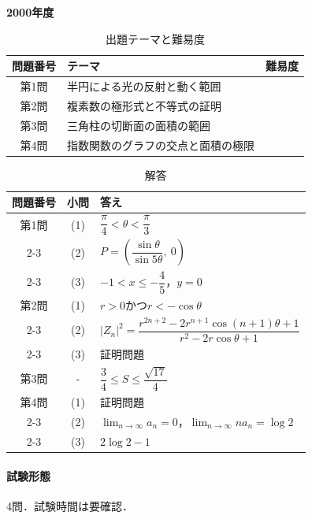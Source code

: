\documentclass[../../main.tex]{subfiles}
\begin{document}
\begin{center}
  {\fontsize{48pt}{58pt}\selectfont \textbf{2000}\normalsize\textbf{年度}}
\end{center}

\begin{table}[htb]
  \centering
  \caption{出題テーマと難易度}
  \begin{tabular}{|c|p{9cm}|c|}
    \hline
    \textbf{問題番号} & \textbf{テーマ} & \textbf{難易度} \\
    \hline
    第1問 & 半円による光の反射と動く範囲 & \\
    \hline
    第2問 & 複素数の極形式と不等式の証明 & \\
    \hline
    第3問 & 三角柱の切断面の面積の範囲 & \\
    \hline
    第4問 & 指数関数のグラフの交点と面積の極限 & \\
    \hline
  \end{tabular}
\end{table}

\begin{table}[htb]
  \centering
  \caption{解答}
  \renewcommand{\arraystretch}{1.4}
  \begin{tabular}{|c|c|p{9cm}|}
    \hline
    \textbf{問題番号} & \textbf{小問} & \textbf{答え} \\
    \hline
    第1問 & (1) & $\dfrac{\pi}{4}<\theta<\dfrac{\pi}{3}$ \\
    \cline{2-3}
    & (2) & $P=\left(\dfrac{\sin\theta}{\sin5\theta},\ 0\right)$ \\
    \cline{2-3}
    & (3) & $-1<x\le-\dfrac{4}{5}$，$y=0$ \\
    \hline
    第2問 & (1) & $r>0$かつ$r<-\cos\theta$ \\
    \cline{2-3}
    & (2) & $|Z_n|^2=\dfrac{r^{2n+2}-2r^{n+1}\cos(n+1)\theta+1}{r^2-2r\cos\theta+1}$ \\
    \cline{2-3}
    & (3) & 証明問題 \\
    \hline
    第3問 & - & $\dfrac{3}{4}\le S\le\dfrac{\sqrt{17}}{4}$ \\
    \hline
    第4問 & (1) & 証明問題 \\
    \cline{2-3}
    & (2) & $\displaystyle\lim_{n\to\infty}a_n=0$，$\displaystyle\lim_{n\to\infty}na_n=\log2$ \\
    \cline{2-3}
    & (3) & $2\log2-1$ \\
    \hline
  \end{tabular}
\end{table}

\paragraph{試験形態}
4問．試験時間は要確認．
\end{document}
